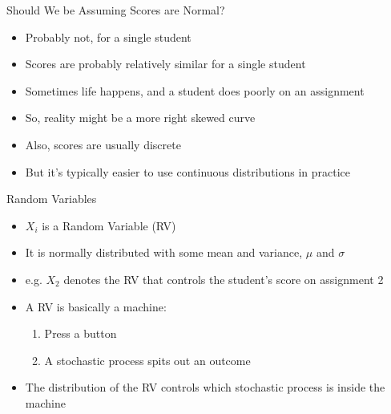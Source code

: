 \documentclass[aspectratio=169]{beamer}
\begin{document}
\begin{frame}{Should We be Assuming Scores are Normal?}
\begin{itemize}
\item Probably not, for a single student
\item Scores are probably relatively similar for a single student
\item Sometimes life happens, and a student does poorly on an assignment
\item So, reality might be a more right skewed curve
\item Also, scores are usually discrete
\item But it's typically easier to use continuous distributions in practice
\end{itemize}
\end{frame}

\begin{frame}{Random Variables}
\begin{itemize}
\item $X_i$ is a Random Variable (RV)
\item It is normally distributed with some mean and variance, $\mu$ and $\sigma$
\item e.g. $X_2$ denotes the RV that controls the student's score on assignment 2
\item A RV is basically a machine:
\begin{enumerate}
\item Press a button
\item A stochastic process spits out an outcome
\end{enumerate}
\item The distribution of the RV controls which stochastic process is inside the machine
\end{itemize}
\end{frame}
\end{document}
